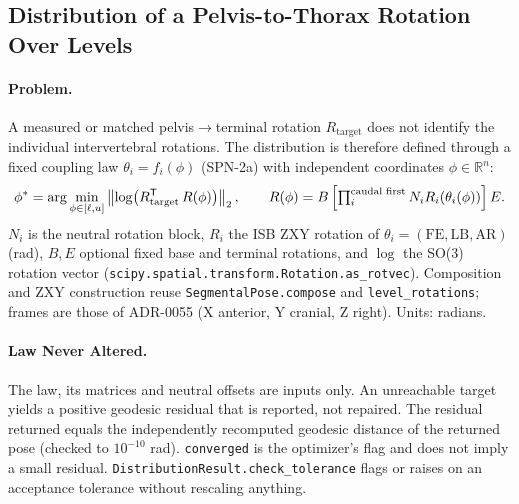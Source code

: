 \subsection{Distribution of a Pelvis-to-Thorax Rotation Over Levels}
\label{sec:spn-2b}

\paragraph{Problem.}
A measured or matched pelvis$\to$terminal rotation $R_{\mathrm{target}}$ does not
identify the individual intervertebral rotations. The distribution is therefore
defined through a fixed coupling law $\theta_i = f_i(\phi)$ (SPN-2a) with
independent coordinates $\phi\in\mathbb{R}^{n}$:
\begin{equation}
  \phi^{*}=\arg\min_{\phi\in[\ell,u]}
  \left\lVert \log\!\left(R_{\mathrm{target}}^{\mathsf T}\,R(\phi)\right)\right\rVert_2,
  \qquad
  R(\phi)=B\,\Bigl[\textstyle\prod_{i}^{\text{caudal first}} N_i R_i(\theta_i(\phi))\Bigr]\,E .
\end{equation}
$N_i$ is the neutral rotation block, $R_i$ the ISB ZXY rotation of
$\theta_i=(\mathrm{FE},\mathrm{LB},\mathrm{AR})$ (rad), $B,E$ optional fixed base and
terminal rotations, and $\log$ the SO(3) rotation vector
(\texttt{scipy.spatial.transform.Rotation.as\_rotvec}). Composition and ZXY
construction reuse \texttt{SegmentalPose.compose} and
\texttt{level\_rotations}; frames are those of ADR-0055 (X anterior, Y cranial,
Z right). Units: radians.

\paragraph{Law Never Altered.}
The law, its matrices and neutral offsets are inputs only. An unreachable target
yields a positive geodesic residual that is reported, not repaired. The
residual returned equals the independently recomputed geodesic distance of the
returned pose (checked to $10^{-10}$ rad). \texttt{converged} is the optimizer's
flag and does not imply a small residual. \texttt{DistributionResult.check\_tolerance}
flags or raises on an acceptance tolerance without rescaling anything.


